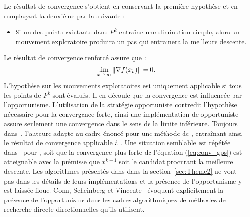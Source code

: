 Le résultat de convergence s'obtient en conservant la première hypothèse et en remplaçant la deuxième par la suivante : 
\begin{itemize}
	\item Si un des points existants dans $P^k$ entraîne une diminution simple, alors un mouvement exploratoire produira un pas qui entrainera la meilleure descente. 
\end{itemize}
Le résultat de convergence renforcé assure que :
\begin{equation}
	\label{eq:conv_gps_renforcé}\lim\limits_{x\rightarrow \infty}\left\lVert\nabla f(x_k)\right\rVert = 0.
\end{equation}
L'hypothèse sur les mouvements exploratoires est uniquement applicable si tous les points de $P^k$ sont évalués. Il en découle que la convergence est influencée par l'opportunisme. L'utilisation de la stratégie opportuniste contredit l'hypothèse nécessaire pour la convergence forte, ainsi une implémentation de \GPS opportuniste assure seulement une convergence dans le sens de la limite inférieure. Toujours dans~\cite{Torc97a}, l'auteure adapte \CS au cadre énoncé pour une méthode de \GPS, entraînant ainsi le résultat de convergence applicable à \CS. Une situation semblable est répétée dans~\cite{KoLeTo03a} pour \GSS, soit que la convergence plus forte de l'équation (\ref{eq:conv_gps}) est atteignable avec la prémisse que $x^{k+1}$ soit le candidat procurant la meilleure descente. 
Les algorithmes présentés dans dans la section~\ref{sec:Theme2} ne vont pas dans les détails de leurs implémentations et la présence de l'opportunisme y est laissée floue. Conn, Scheinberg et Vincente~\cite{CoScVibook} évoquent explicitement la présence de l'opportunisme dans les cadres algorithmiques de méthodes de recherche directe directionnelles qu'ils utilisent.
